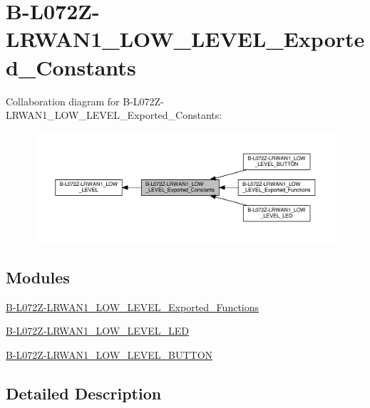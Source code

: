\hypertarget{group__B-L072Z-LRWAN1__LOW__LEVEL__Exported__Constants}{}\section{B-\/\+L072\+Z-\/\+L\+R\+W\+A\+N1\+\_\+\+L\+O\+W\+\_\+\+L\+E\+V\+E\+L\+\_\+\+Exported\+\_\+\+Constants}
\label{group__B-L072Z-LRWAN1__LOW__LEVEL__Exported__Constants}
Collaboration diagram for B-\/\+L072\+Z-\/\+L\+R\+W\+A\+N1\+\_\+\+L\+O\+W\+\_\+\+L\+E\+V\+E\+L\+\_\+\+Exported\+\_\+\+Constants\+:
\nopagebreak
\begin{figure}[H]
\begin{center}
\leavevmode
\includegraphics[width=350pt]{group__B-L072Z-LRWAN1__LOW__LEVEL__Exported__Constants}
\end{center}
\end{figure}
\subsection*{Modules}
\begin{DoxyCompactItemize}
\item 
\hyperlink{group__B-L072Z-LRWAN1__LOW__LEVEL__Exported__Functions}{B-\/\+L072\+Z-\/\+L\+R\+W\+A\+N1\+\_\+\+L\+O\+W\+\_\+\+L\+E\+V\+E\+L\+\_\+\+Exported\+\_\+\+Functions}
\item 
\hyperlink{group__B-L072Z-LRWAN1__LOW__LEVEL__LED}{B-\/\+L072\+Z-\/\+L\+R\+W\+A\+N1\+\_\+\+L\+O\+W\+\_\+\+L\+E\+V\+E\+L\+\_\+\+L\+ED}
\item 
\hyperlink{group__B-L072Z-LRWAN1__LOW__LEVEL__BUTTON}{B-\/\+L072\+Z-\/\+L\+R\+W\+A\+N1\+\_\+\+L\+O\+W\+\_\+\+L\+E\+V\+E\+L\+\_\+\+B\+U\+T\+T\+ON}
\end{DoxyCompactItemize}


\subsection{Detailed Description}
